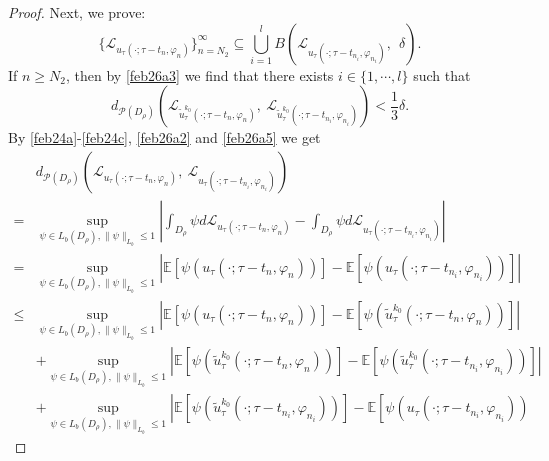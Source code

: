 \documentclass[11pt]{article}
\numberwithin{equation}{section}
\theoremstyle{plain}
\newcommand{\E}{\mathbb{E}}
\def\be{\begin{equation}}
\def\ee{\end{equation}}
\begin{document}
\begin{proof}
  
  Next, we prove:
  \be\label{feb26a4}
 \{ \mathcal{L}_{
  {u} _\tau
                (\cdot; \tau -t_n,
             \varphi_n  )
 }\}_{n=N_2}^\infty
 \subseteq
\bigcup_{i=1}^{l}
 B\left (
 \mathcal{L}_{
 {u}_\tau
                (\cdot; \tau -t_{n_i},
             \varphi_{n_i}  )},\ 
 \   \delta
 \right ).
 \ee
   If  $n\ge N_2$, 
  then by
\eqref{feb26a3} we find that
there exists $i\in \{1,\cdots, l\}$ such that
  \be\label{feb26a5} 
 d_{
 \mathcal{P}
 (D_\rho)
 }
  \left (
   \mathcal{L}_{
 \widetilde{u}^{k_0}_\tau
                (\cdot; \tau -t_n,
             \varphi_n  )
 }, \
 \mathcal{L}_{
 \widetilde{u}^{k_0}_\tau
                (\cdot; \tau -t_{n_i},
             \varphi_{n_i}  )}
  \right )
  <{\frac 13}\delta.
  \ee  
   By \eqref{feb24a}-\eqref{feb24c},
  \eqref{feb26a2}
 and \eqref{feb26a5}
 we get  
\begin{align*}
 & d_{
 \mathcal{P}
 (D_\rho)
 }
 \left (
 \mathcal{L}_{   u_\tau   ( \cdot; \tau - t_n,  \varphi_n   )},
 \
 \mathcal{L}_{  u _\tau  ( \cdot; \tau - t_{n_i},  \varphi_{n_i}   )}
 \right )  \nonumber\\
 = &
 \sup_{\psi \in L_b
 (D_\rho), \|\psi\|_{L_b}
 \le 1}
 \left |
 \int_ {D_\rho}
 \psi   d \mathcal{L}_{   u_\tau   ( \cdot; \tau - t_n,  \varphi_n   )}
 -\int_ {D_\rho}
 \psi  d\mathcal{L}_{  u_\tau   ( \cdot; \tau - t_{n_i},  \varphi_{n_i}   )}
 \right |  \nonumber\\
 = &
 \sup_{\psi \in L_b(
 {D_\rho}
 ), \|\psi\|_{L_b}
 \le 1}
 \left |
 \E \left[
 \psi    (  u _\tau  ( \cdot; \tau - t_n,  \varphi_n   ) )
 \right]
 -\E \left[
 \psi  (  u_\tau   ( \cdot; \tau - t_{n_i},  \varphi_{n_i}   ))
 \right]
 \right |  \nonumber\\
 \le &
 \sup_{\psi \in L_b( {D_\rho}), \|\psi\|_{L_b}
 \le 1}
 \left |
 \E \left[
 \psi    (  u_\tau   ( \cdot; \tau - t_n,  \varphi_n   ) )
 \right]
 -\E \left[
 \psi  (  \widetilde{u}
 _\tau^{k_0}   ( \cdot; \tau - t_{n},  \varphi_{n}   ))
 \right]
 \right |  \nonumber\\
& +
 \sup_{\psi \in L_b( {D_\rho}), \|\psi\|_{L_b}
 \le 1}
 \left |
 \E \left[
 \psi( \widetilde{ u}
 _\tau^{k_0}   ( \cdot; \tau - t_n,  \varphi_n   ) )
 \right]
 -\E \left[
 \psi ( \widetilde{u}_\tau^{k_0}( \cdot; \tau - t_{n_i},  \varphi_{n_i} ) )
 \right]
 \right |  \nonumber\\
& +
 \sup_{\psi \in L_b(
 {D_\rho}
 ), \|\psi\|_{L_b}
 \le 1}
 \left |
 \E \left[
 \psi ( \widetilde{ u}_\tau^{k_0}
    ( \cdot; \tau - t_{n_i},  \varphi_{n_i}   ))
 \right]
 -
 \E \left[
 \psi( u_\tau    ( \cdot; \tau - t_{n_i},  \varphi_{n_i}   ))

\end{align*}
\end{proof}
\end{document}
